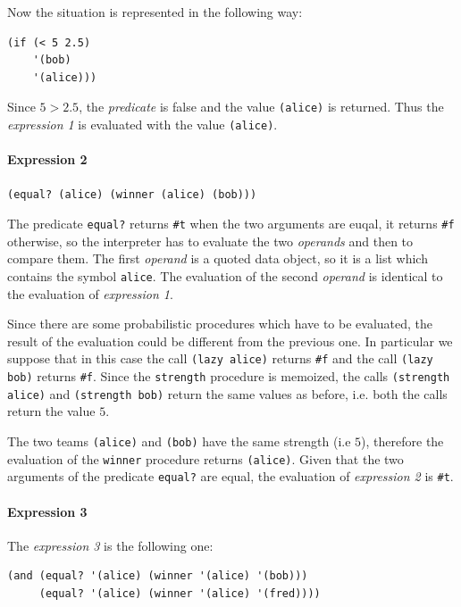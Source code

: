 \begin{itemize}
        Now the situation is represented in the following way:
        \begin{lstlisting}[caption={Expression to be evaluated after evaluating \texttt{(total-pulling \textquotesingle bob)}}, captionpos=b]
(if (< 5 2.5)
    '(bob)
    '(alice)))  
        \end{lstlisting}
        Since $5 > 2.5$, the \textit{predicate} is false and the value \texttt{\textquotesingle(alice)} is returned. Thus the \textit{expression 1}
        is evaluated with the value \texttt{\textquotesingle(alice)}.


        \paragraph*{Expression 2} \texttt{(equal? \textquotesingle(alice) (winner \textquotesingle(alice) \textquotesingle(bob)))}

        The predicate \texttt{equal?} returns \texttt{\#t} when the two arguments are euqal, it returns \texttt{\#f} otherwise, so
        the interpreter has to evaluate the two \textit{operands} and then to compare them. The first \textit{operand} is a quoted
        data object, so it is a list which contains the symbol \texttt{\textquotesingle alice}. The evaluation of the second \textit{operand} is
        identical to the evaluation of \textit{expression 1}.
        
        Since there are some probabilistic procedures which have to be evaluated, the result of the evaluation could be different 
        from the previous one. In particular we suppose that in this case the call \texttt{(lazy \textquotesingle alice)} returns \texttt{\#f} and 
        the call \texttt{(lazy \textquotesingle bob)} returns \texttt{\#f}.
        Since the \texttt{strength} procedure is memoized, the calls \texttt{(strength \textquotesingle alice)} and \texttt{(strength \textquotesingle bob)} return
        the same values as before, i.e. both the calls return the value $5$.
        
        The two teams \texttt{\textquotesingle(alice)} and \texttt{\textquotesingle(bob)} have the same strength (i.e $5$), 
        therefore the evaluation of the \texttt{winner} procedure returns \texttt{\textquotesingle (alice)}.
        Given that the two arguments of the predicate \texttt{equal?} are equal, the evaluation of \textit{expression 2} is \texttt{\#t}.


        \paragraph*{Expression 3} The \textit{expression 3} is the following one: 
        \begin{lstlisting}
(and (equal? '(alice) (winner '(alice) '(bob)))
     (equal? '(alice) (winner '(alice) '(fred))))
        \end{lstlisting}


\end{itemize}
